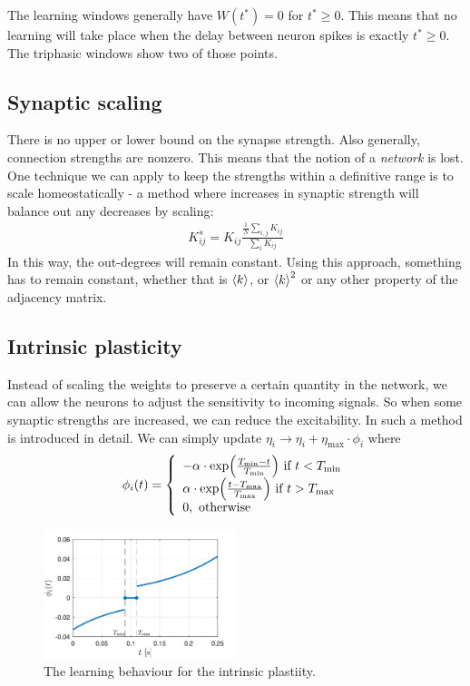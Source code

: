 The learning windows generally have $W(t^{\ast}) = 0$ for $t^{\ast} \geq 0$. This means that no learning will take place when the delay between neuron spikes is exactly $t^{\ast} \geq 0$. The triphasic windows show two of those points. 

\subsection{Synaptic scaling}
There is no upper or lower bound on the synapse strength. Also generally, connection strengths are nonzero. This means that the notion of a \textsl{network} is lost.\\
One technique we can apply to keep the strengths within a definitive range is to scale homeostatically - a method where increases in synaptic strength will balance out any decreases by scaling:
\begin{align}
K_{ij}^s = K_{ij} \frac{\frac{1}{N} \sum_{i,j} K_{ij}}{\sum_{i} K_{ij}}
\end{align}
In this way, the out-degrees will remain constant. Using this approach, something has to remain constant, whether that is ${\langle k\rangle}$, or ${\langle k\rangle}^2$ or any other property of the adjacency matrix.


\subsection{Intrinsic plasticity}
Instead of scaling the weights to preserve a certain quantity in the network, we can allow the neurons to adjust the sensitivity to incoming signals. So when some synaptic strengths are increased, we can reduce the excitability. In \cite{Song2017} such a method is introduced in detail. We can simply update $\eta_{i} \rightarrow \eta_{i} + \eta_{\max } \cdot \phi_{i}$ where 
\begin{align}
\phi_{i} (t) =\left\{\begin{array}{l}-\alpha \cdot \exp \left(\frac{T_{\min }-t}{T_{\rm min }}\right) \text { if } t<T_{ \rm min } \\ \alpha \cdot \exp \left(\frac{t-T_{\rm max }}{T_{\max }}\right) \text { if } t >T_{\rm max } \\ 0, \text { otherwise }\end{array}\right.
\end{align}

\begin{figure}[H]
\centering
\includegraphics[width = 0.5\textwidth]{../Figures/Learning/IPlearningFunction.png}
\caption{The learning behaviour for the intrinsic plastiity.}
\label{fig:IPlearningFunction}
\end{figure}

